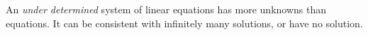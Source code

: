 \documentclass[12pt]{article}
\begin{document}
An \emph{under determined} system of linear equations has more unknowns than equations.  It can be consistent with infinitely many solutions, or have no solution.
\end{document}
